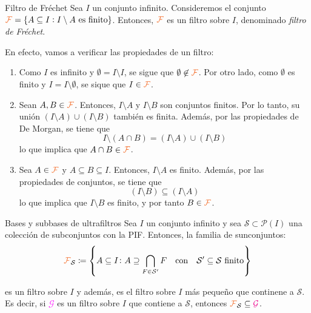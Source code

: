 \documentclass[titlepage,11pt,a4paper]{book}
\newcommand{\filt}{\ensuremath{\textcolor{Orange}{\mathcal{F}}}}
\begin{document}
\begin{ejemplo*}{Filtro de Fréchet}
    Sea $I$ un conjunto infinito. Consideremos el conjunto $\filt = \{A \subseteq I : I \setminus A \text{ es finito}\}$. Entonces, $\filt$ es un filtro sobre $I$, denominado \textit{filtro de Fréchet}.

    \medskip
    En efecto, vamos a verificar las propiedades de un filtro:
    \begin{enumerate}
        \item[(i)] Como $I$ es infinito y $\emptyset = I \setminus I$, se sigue que $\emptyset \not \in \filt$. Por otro lado, como $\emptyset$ es finito y $I = I \setminus \emptyset$, se sique que $I \in \filt$.
        \item[(ii)] Sean $A, B \in \filt$. Entonces, $I \setminus A$ y $I \setminus B$ son conjuntos finitos. Por lo tanto, su unión $(I \setminus A) \cup (I \setminus B)$ también es finita. Además, por las propiedades de De Morgan, se tiene que
        \[
        I \setminus (A \cap B) = (I \setminus A) \cup (I \setminus B)
        \]
        lo que implica que $A \cap B \in \filt$.
        \item[(iii)] Sea $A \in \filt$ y $A \subseteq B \subseteq I$. Entonces, $I \setminus A$ es finito. Además, por las propiedades de conjuntos, se tiene que
        \[
        (I \setminus B) \subseteq (I \setminus A)
        \]
        lo que implica que $I \setminus B$ es finito, y por tanto $B \in \filt$.
    \end{enumerate}
\end{ejemplo*}

\begin{prop*}{Bases y subbases de ultrafiltros}
Sea $I$ un conjunto infinito y sea $\mathcal S \subset \mathcal P(I)$ una colección de subconjuntos con la PIF. Entonces, la familia de sunconjuntos:
$$
\filt_{\mathcal{S}} \coloneq \left\{ A \subseteq I \colon A \supseteq \bigcap_{F \in \mathcal{S}'} F \quad\text{con}\quad \mathcal{S}' \subseteq \mathcal{S} \text{ finito} \right\}
$$

es un filtro sobre $I$ y además, es el filtro sobre $I$ más pequeño que continene a $\mathcal S$. Es decir, si \textcolor{magenta}{$\mathcal G$} es un filtro sobre $I$ que contiene a $\mathcal S$, entonces $\filt_{\mathcal{S}} \subseteq \textcolor{magenta}{\mathcal G}$.

\end{prop*}
\end{document}
